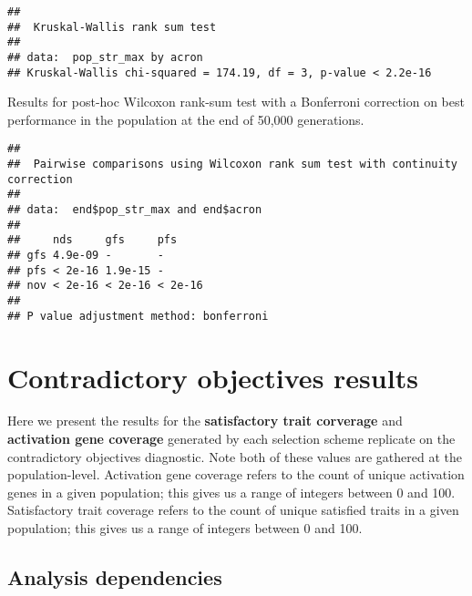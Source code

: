 \documentclass[]{book}
\newenvironment{Shaded}{\begin{snugshade}}{\end{snugshade}}
\newcommand{\DataTypeTok}[1]{\textcolor[rgb]{0.13,0.29,0.53}{#1}}
\newcommand{\KeywordTok}[1]{\textcolor[rgb]{0.13,0.29,0.53}{\textbf{#1}}}
\newcommand{\NormalTok}[1]{#1}
\newcommand{\OperatorTok}[1]{\textcolor[rgb]{0.81,0.36,0.00}{\textbf{#1}}}
\newcommand{\OtherTok}[1]{\textcolor[rgb]{0.56,0.35,0.01}{#1}}
\newcommand{\StringTok}[1]{\textcolor[rgb]{0.31,0.60,0.02}{#1}}
\begin{document}
\begin{verbatim}
## 
##  Kruskal-Wallis rank sum test
## 
## data:  pop_str_max by acron
## Kruskal-Wallis chi-squared = 174.19, df = 3, p-value < 2.2e-16
\end{verbatim}

Results for post-hoc Wilcoxon rank-sum test with a Bonferroni correction on best performance in the population at the end of 50,000 generations.

\begin{Shaded}
\end{Shaded}

\begin{verbatim}
## 
##  Pairwise comparisons using Wilcoxon rank sum test with continuity correction 
## 
## data:  end$pop_str_max and end$acron 
## 
##     nds     gfs     pfs    
## gfs 4.9e-09 -       -      
## pfs < 2e-16 1.9e-15 -      
## nov < 2e-16 < 2e-16 < 2e-16
## 
## P value adjustment method: bonferroni
\end{verbatim}

\hypertarget{contradictory-objectives-results}{%
\chapter{Contradictory objectives results}\label{contradictory-objectives-results}}

Here we present the results for the \textbf{satisfactory trait corverage} and \textbf{activation gene coverage} generated by each selection scheme replicate on the contradictory objectives diagnostic.
Note both of these values are gathered at the population-level.
Activation gene coverage refers to the count of unique activation genes in a given population; this gives us a range of integers between 0 and 100.
Satisfactory trait coverage refers to the count of unique satisfied traits in a given population; this gives us a range of integers between 0 and 100.

\hypertarget{analysis-dependencies-2}{%
\section{Analysis dependencies}\label{analysis-dependencies-2}}
\end{document}
